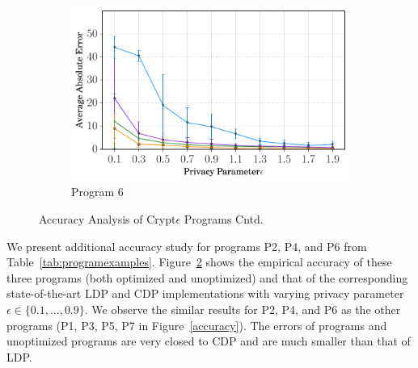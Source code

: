 \begin{figure}
\begin{subfigure}[b]{0.25\linewidth}
    \centering    \includegraphics[width=1\linewidth]{6_finals.pdf}
        \caption{Program 6}
        \label{fig:P6}\end{subfigure}
   \caption{Accuracy Analysis of Crypt$\epsilon$ Programs Cntd.}
   \label{accuracy-appendix}
\end{figure}

We present additional accuracy study for \system programs P2, P4, and P6 from Table~\ref{tab:programexamples}. Figure~\ref{accuracy-appendix} shows the empirical accuracy of these three programs (both optimized and unoptimized) and that of the corresponding state-of-the-art \textsf{LDP} \cite{LDP1} and \textsf{CDP} \cite{Dork} implementations  with varying privacy parameter $\epsilon \in \{0.1,...,0.9\}$. We observe the similar results for P2, P4, and P6 as the other programs (P1, P3, P5, P7 in Figure~\ref{accuracy}). The errors of \system programs and unoptimized \system programs are very closed to \textsf{CDP} and are much smaller than that of \textsf{LDP}.
